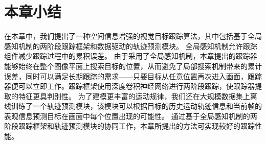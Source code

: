 \section{本章小结}
在本章中，我们提出了一种空间信息增强的视觉目标跟踪算法，其中包括基于全局感知机制的两阶段跟踪框架和数据驱动的轨迹预测模块。
全局感知机制允许跟踪组件减少跟踪过程中的累积误差。
由于采用了全局感知机制，本章提出的跟踪器能够始终在整个图像平面上搜索目标的位置，从而避免了局部搜索机制带来的累计误差，同时可以满足长期跟踪的需求——只要目标从任意位置再次进入画面，跟踪器便可以立即工作。跟踪框架使用深度卷积神经网络进行两阶段跟踪，使跟踪器提取的特征更具判别性。
为了建模更丰富的运动规律，我们还在大规模数据集上离线训练了一个轨迹预测模块，该模块可以根据目标的历史运动轨迹信息和当前帧的表观信息预测目标在画面中每个位置出现的可能性。
通过基于全局感知机制的两阶段跟踪框架和轨迹预测模块的协同工作，本章所提出的方法可实现较好的跟踪性能。